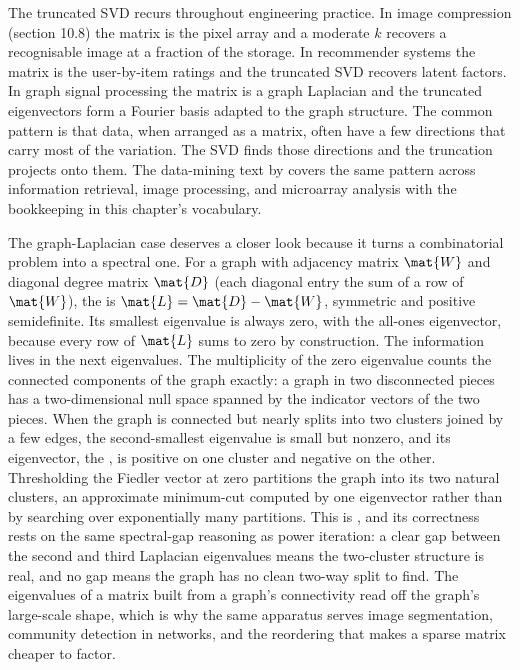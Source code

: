 The truncated SVD recurs throughout engineering practice. In image
compression (section 10.8) the matrix is the pixel array and a
moderate $k$ recovers a recognisable image at a fraction of the
storage. In recommender systems the matrix is the
user-by-item ratings and the truncated SVD recovers latent factors.
In graph signal processing the matrix is a graph Laplacian and the
truncated eigenvectors form a Fourier basis adapted to the graph
structure. The common pattern is that data, when arranged as a
matrix, often have a few directions that carry most of the
variation. The SVD finds those directions and the truncation
projects onto them. The data-mining text by \textcite{text:v2ch10-elden2007}
covers the same pattern across information retrieval, image
processing, and microarray analysis with the bookkeeping in this
chapter's vocabulary.

The graph-Laplacian case deserves a closer look because it turns a
combinatorial problem into a spectral one. For a graph with adjacency
matrix $\mat{W}$ and diagonal degree matrix $\mat{D}$ (each diagonal
entry the sum of a row of $\mat{W}$), the  is
$\mat{L} = \mat{D} - \mat{W}$, symmetric and positive semidefinite. Its
smallest eigenvalue is always zero, with the all-ones eigenvector,
because every row of $\mat{L}$ sums to zero by construction. The
information lives in the next eigenvalues. The multiplicity of the zero
eigenvalue counts the connected components of the graph exactly: a
graph in two disconnected pieces has a two-dimensional null space
spanned by the indicator vectors of the two pieces. When the graph is
connected but nearly splits into two clusters joined by a few edges,
the second-smallest eigenvalue is small but nonzero, and its
eigenvector, the , is positive on one cluster
and negative on the other. Thresholding the Fiedler vector at zero
partitions the graph into its two natural clusters, an approximate
minimum-cut computed by one eigenvector rather than by searching over
exponentially many partitions. This is ,
and its correctness rests on the same spectral-gap reasoning as power
iteration: a clear gap between the second and third Laplacian
eigenvalues means the two-cluster structure is real, and no gap means
the graph has no clean two-way split to find. The eigenvalues of a
matrix built from a graph's connectivity read off the graph's
large-scale shape, which is why the same apparatus serves image
segmentation, community detection in networks, and the reordering that
makes a sparse matrix cheaper to factor.


